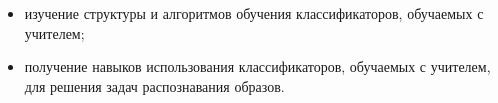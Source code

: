 
\begin{itemize}

	\item изучение структуры и алгоритмов обучения классификаторов, обучаемых с учителем;
	\item получение навыков использования классификаторов, обучаемых с учителем, для решения задач распознавания образов.

\end{itemize}

